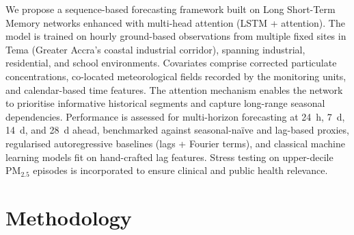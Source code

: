 \documentclass[a4paper,fleqn]{cas-sc}
\begin{document}



We propose a sequence-based forecasting framework built on Long Short-Term Memory networks enhanced with multi-head attention (LSTM + attention). The model is trained on hourly ground-based observations from multiple fixed sites in Tema (Greater Accra’s coastal industrial corridor), spanning industrial, residential, and school environments. Covariates comprise corrected particulate concentrations, co-located meteorological fields recorded by the monitoring units, and calendar-based time features. The attention mechanism enables the network to prioritise informative historical segments and capture long-range seasonal dependencies. Performance is assessed for multi-horizon forecasting at 24~h, 7~d, 14~d, and 28~d ahead, benchmarked against seasonal-naïve and lag-based proxies, regularised autoregressive baselines (lags + Fourier terms), and classical machine learning models fit on hand-crafted lag features. Stress testing on upper-decile PM$_{2.5}$ episodes is incorporated to ensure clinical and public health relevance.





\section{Methodology}\label{sec2}
\end{document}
